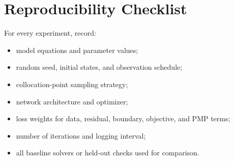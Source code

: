 \documentclass[11pt,a4paper]{article}
\begin{document}
\section{Reproducibility Checklist}
For every experiment, record:
\begin{itemize}
\item model equations and parameter values;
\item random seed, initial states, and observation schedule;
\item collocation-point sampling strategy;
\item network architecture and optimizer;
\item loss weights for data, residual, boundary, objective, and PMP terms;
\item number of iterations and logging interval;
\item all baseline solvers or held-out checks used for comparison.
\end{itemize}
\end{document}
